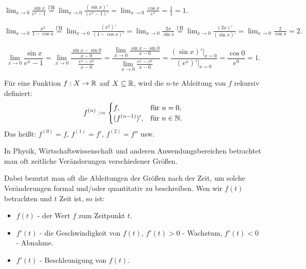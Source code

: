 \begin{bsp} {\  } 
	\begin{enuma} 
		\item $\lim_{x \to 0} \frac{\sin x}{e^x - 1} \stackrel{\text{l'H}}{=} \lim_{x \to 0} \frac{(\sin x)'}{ (e^x - 1)'} = \lim_{x \to 0} \frac{\cos x}{ e^x} = \frac{1}{1} = 1$. 
		\item $\lim_{x \to 0} \frac{x^2}{1 - \cos x} \stackrel{\text{l'H}}{=} \lim_{x \to 0} \frac{ (x^2)'}{ (1- \cos x)'} = \lim_{x \to 0} \frac{ 2 x }{ \sin x} \stackrel{\text{l'H}}{=} \lim_{x \to 0} \frac{(2 x)'}{(\sin x)'}  = \lim_{x \to 0} \frac{ 2}{ \cos x} = 2.$ 
	\end{enuma} 
\end{bsp} 

\begin{bsp}
	\[
		\lim_{x \to 0} \frac{\sin x}{e^x - 1} =\lim_{x \to 0} \frac{ \frac{ \sin x - \sin 0}{x - 0} }{ \frac{e^x - e^0}{x-0} } = \frac{\lim_{x \to 0} \frac{ \sin x - \sin 0}{x - 0}}{\lim_{x \to 0} \frac{e^x - e^0}{x-0}}  = \frac{(\sin x)'|_{x=0}}{ (e^x)'|_{x =0}} = \frac{\cos 0}{ e^0} = 1. 
	\]
\end{bsp} 

\begin{defn} 
	Für eine Funktion $f : X \to \mathbb{R}$ auf $X \subseteq \mathbb{R}$, wird die $n$-te Ableitung von $f$ rekursiv definiert: 
	\[
	f^{(n)} := \begin{cases} 
	f, & \text{für} \ n =0,
	\\ (f^{(n-1)})', & \text{für} \ n \in \mathbb{N}. 
	\end{cases} 
	\]
	Das heißt: $f^{(0)} = f$, $f^{(1)} = f'$, $f^{(2)} = f''$ usw. 
\end{defn} 

\begin{bem}
	In Physik, Wirtschaftswissenschaft und anderen Anwendungsbereichen betrachtet man oft zeitliche Veränderungen verschiedener Größen. 
	
	Dabei benutzt man oft die Ableitungen der Größen nach der Zeit, um solche Veränderungen formal und/oder quantitativ zu beschreiben. Wen wir $f(t)$ betrachten und  $t$ Zeit ist, so ist: 
	\begin{itemize} 
		\item $f(t)$ - der Wert $f$ zum Zeitpunkt $t$. 
		\item $f'(t)$ - die Geschwindigkeit von $f(t)$, $f'(t)>0$ - Wachstum, $f'(t)<0$ - Abnahme. 
		\item $f'(t)$ - Beschleunigung von $f(t)$. 
	\end{itemize} 
\end{bem} 

